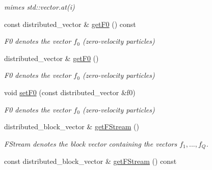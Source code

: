 \begin{DoxyCompactItemize}
\begin{DoxyCompactList}\small\item\em mimes std\-::vector.\-at(i) \end{DoxyCompactList}\item 
\hypertarget{classnatrium_1_1DistributionFunctions_a3d76ae4f928f324ec82099dbdce678d7}{const distributed\-\_\-vector \& \hyperlink{classnatrium_1_1DistributionFunctions_a3d76ae4f928f324ec82099dbdce678d7}{get\-F0} () const }\label{classnatrium_1_1DistributionFunctions_a3d76ae4f928f324ec82099dbdce678d7}

\begin{DoxyCompactList}\small\item\em F0 denotes the vector $ f_0 $ (zero-\/velocity particles) \end{DoxyCompactList}\item 
\hypertarget{classnatrium_1_1DistributionFunctions_abb98df52461532f58e77741dd9b6a975}{distributed\-\_\-vector \& \hyperlink{classnatrium_1_1DistributionFunctions_abb98df52461532f58e77741dd9b6a975}{get\-F0} ()}\label{classnatrium_1_1DistributionFunctions_abb98df52461532f58e77741dd9b6a975}

\begin{DoxyCompactList}\small\item\em F0 denotes the vector $ f_0 $ (zero-\/velocity particles) \end{DoxyCompactList}\item 
\hypertarget{classnatrium_1_1DistributionFunctions_ae7cc68f9576384b3fbec8f171856f607}{void \hyperlink{classnatrium_1_1DistributionFunctions_ae7cc68f9576384b3fbec8f171856f607}{set\-F0} (const distributed\-\_\-vector \&f0)}\label{classnatrium_1_1DistributionFunctions_ae7cc68f9576384b3fbec8f171856f607}

\begin{DoxyCompactList}\small\item\em F0 denotes the vector $ f_0 $ (zero-\/velocity particles) \end{DoxyCompactList}\item 
\hypertarget{classnatrium_1_1DistributionFunctions_a74dfe8e6ac6d5f463dcb8220f37800a3}{distributed\-\_\-block\-\_\-vector \& \hyperlink{classnatrium_1_1DistributionFunctions_a74dfe8e6ac6d5f463dcb8220f37800a3}{get\-F\-Stream} ()}\label{classnatrium_1_1DistributionFunctions_a74dfe8e6ac6d5f463dcb8220f37800a3}

\begin{DoxyCompactList}\small\item\em F\-Stream denotes the block vector containing the vectors $ f_1, ..., f_Q $. \end{DoxyCompactList}\item 
\hypertarget{classnatrium_1_1DistributionFunctions_a88224d528262c522ea2ad8bec11178c1}{const distributed\-\_\-block\-\_\-vector \& \hyperlink{classnatrium_1_1DistributionFunctions_a88224d528262c522ea2ad8bec11178c1}{get\-F\-Stream} () const }\label{classnatrium_1_1DistributionFunctions_a88224d528262c522ea2ad8bec11178c1}


\end{DoxyCompactItemize}
